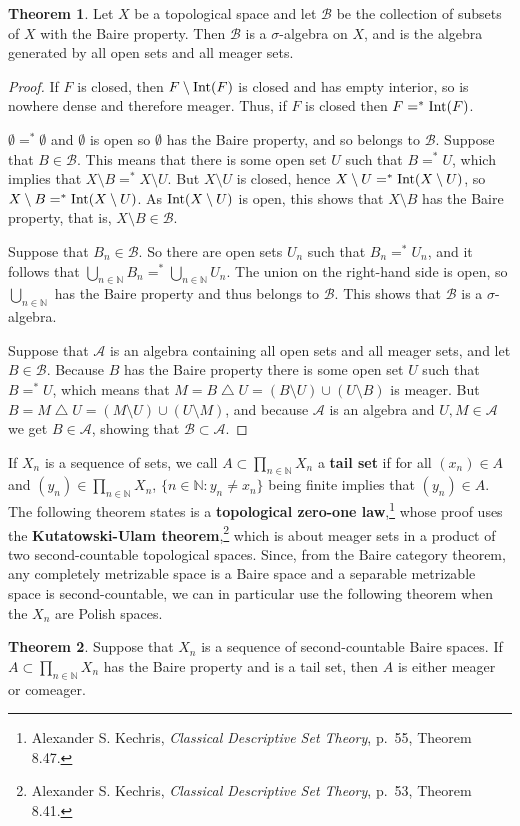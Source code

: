 \documentclass{article}
\newcommand{\Int}{\ensuremath\mathrm{Int}}
\theoremstyle{definition}
\newtheorem{theorem}{Theorem}
\theoremstyle{definition}
\begin{document}
\begin{theorem}
Let $X$ be a topological space and let $\mathscr{B}$ be the collection of subsets of $X$ with the Baire property. Then $\mathscr{B}$ is a $\sigma$-algebra
on $X$, and is the algebra generated by all open sets and all meager sets.
\end{theorem}
\begin{proof}
If $F$ is closed, then
$F \setminus \Int(F)$ is closed and has empty interior, so is nowhere dense and therefore meager. Thus,
if $F$ is closed then $F=^* \Int(F)$.

$\emptyset =^* \emptyset$ and  $\emptyset$ is open so $\emptyset$ has the Baire
property, and so belongs to $\mathscr{B}$. 
Suppose that $B \in \mathscr{B}$. This means that there is some open set $U$ such that $B=^* U$,
which implies that $X \setminus B =^* X \setminus U$. But $X \setminus U$ is closed, hence
$X \setminus U =^* \Int(X \setminus U)$, so $X \setminus B =^* \Int(X \setminus U)$. As
$\Int(X \setminus U)$ is open, this shows that $X \setminus B$ has the Baire property, that is, $X \setminus B \in \mathscr{B}$. 

Suppose that $B_n \in \mathscr{B}$. So there are open sets $U_n$ such that
$B_n =^* U_n$, and it follows that
$\bigcup_{n \in \mathbb{N}} B_n =^* \bigcup_{n \in \mathbb{N}} U_n$. The union on the right-hand side is open,
so $\bigcup_{n \in \mathbb{N}}$ has the Baire property and thus belongs to $\mathscr{B}$. This shows that $\mathscr{B}$
is a $\sigma$-algebra. 

Suppose that $\mathscr{A}$ is an algebra containing all open sets and all meager sets, and let
$B \in \mathscr{B}$. Because $B$ has the Baire property there is some open set $U$ such that
$B=^* U$, which means that $M=B \bigtriangleup U=(B\setminus U) \cup (U \setminus B)$ is meager. 
But $B = M \bigtriangleup U = (M \setminus U) \cup (U \setminus M)$, and because $\mathscr{A}$ is an algebra
and $U,M \in \mathscr{A}$ we get $B \in \mathscr{A}$, showing that $\mathscr{B} \subset \mathscr{A}$. 
\end{proof}



If $X_n$ is a sequence of sets, we call $A \subset \prod_{n \in \mathbb{N}} X_n$ a \textbf{tail set}
if for all $(x_n) \in A$ and $(y_n) \in \prod_{n \in \mathbb{N}} X_n$, $\{n \in \mathbb{N}: y_n \neq x_n\}$ 
being finite implies that $(y_n) \in A$. The following theorem states is a \textbf{topological zero-one law},\footnote{Alexander S. Kechris, {\em Classical Descriptive Set Theory}, p.~55, Theorem 8.47.} whose proof uses the \textbf{Kutatowski-Ulam theorem},\footnote{Alexander S. Kechris, {\em Classical Descriptive Set Theory}, p.~53, Theorem 8.41.} which is about
meager sets in a product of two second-countable topological spaces. Since, from the Baire category theorem, any completely metrizable space is a Baire space and
a separable metrizable space is second-countable,
we can in particular use the following theorem when the  $X_n$ are Polish spaces.

\begin{theorem}
Suppose that $X_n$ is a sequence of second-countable Baire spaces. If $A \subset \prod_{n \in \mathbb{N}} X_n$ has the Baire
property and is a tail set, then $A$ is either meager or comeager.
\end{theorem}
\end{document}
